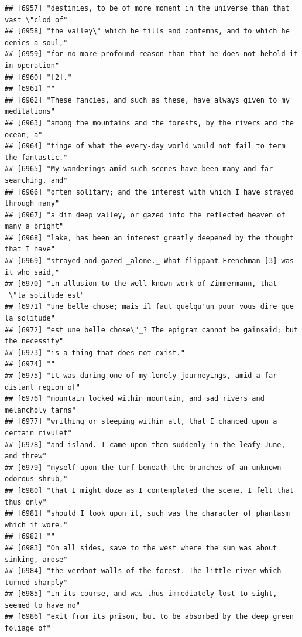 \documentclass{article}\usepackage[]{graphicx}\usepackage[]{color}
\makeatletter
\newenvironment{kframe}{%
 \def\at@end@of@kframe{}%
 \ifinner\ifhmode%
  \def\at@end@of@kframe{\end{minipage}}%
  \begin{minipage}{\columnwidth}%
 \fi\fi%
 \def\FrameCommand##1{\hskip\@totalleftmargin \hskip-\fboxsep
 \colorbox{shadecolor}{##1}\hskip-\fboxsep
     \hskip-\linewidth \hskip-\@totalleftmargin \hskip\columnwidth}%
 \MakeFramed {\advance\hsize-\width
   \@totalleftmargin\z@ \linewidth\hsize
   \@setminipage}}%
 {\par\unskip\endMakeFramed%
 \at@end@of@kframe}
\newenvironment{knitrout}{}{} %
\makeatother
\begin{document}
\begin{knitrout}
\begin{kframe}
\begin{verbatim}
## [6957] "destinies, to be of more moment in the universe than that vast \"clod of"    
## [6958] "the valley\" which he tills and contemns, and to which he denies a soul,"    
## [6959] "for no more profound reason than that he does not behold it in operation"    
## [6960] "[2]."                                                                        
## [6961] ""                                                                            
## [6962] "These fancies, and such as these, have always given to my meditations"       
## [6963] "among the mountains and the forests, by the rivers and the ocean, a"         
## [6964] "tinge of what the every-day world would not fail to term the fantastic."     
## [6965] "My wanderings amid such scenes have been many and far-searching, and"        
## [6966] "often solitary; and the interest with which I have strayed through many"     
## [6967] "a dim deep valley, or gazed into the reflected heaven of many a bright"      
## [6968] "lake, has been an interest greatly deepened by the thought that I have"      
## [6969] "strayed and gazed _alone._ What flippant Frenchman [3] was it who said,"     
## [6970] "in allusion to the well known work of Zimmermann, that _\"la solitude est"   
## [6971] "une belle chose; mais il faut quelqu'un pour vous dire que la solitude"      
## [6972] "est une belle chose\"_? The epigram cannot be gainsaid; but the necessity"   
## [6973] "is a thing that does not exist."                                             
## [6974] ""                                                                            
## [6975] "It was during one of my lonely journeyings, amid a far distant region of"    
## [6976] "mountain locked within mountain, and sad rivers and melancholy tarns"        
## [6977] "writhing or sleeping within all, that I chanced upon a certain rivulet"      
## [6978] "and island. I came upon them suddenly in the leafy June, and threw"          
## [6979] "myself upon the turf beneath the branches of an unknown odorous shrub,"      
## [6980] "that I might doze as I contemplated the scene. I felt that thus only"        
## [6981] "should I look upon it, such was the character of phantasm which it wore."    
## [6982] ""                                                                            
## [6983] "On all sides, save to the west where the sun was about sinking, arose"       
## [6984] "the verdant walls of the forest. The little river which turned sharply"      
## [6985] "in its course, and was thus immediately lost to sight, seemed to have no"    
## [6986] "exit from its prison, but to be absorbed by the deep green foliage of"       

\end{verbatim}
\end{kframe}
\end{knitrout}
\end{document}
